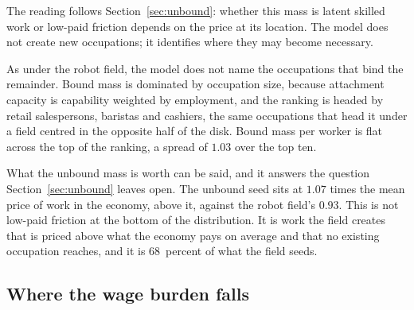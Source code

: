 \documentclass[12pt, a4paper]{article}
\begin{document}
The reading follows Section~\ref{sec:unbound}: whether this mass is
latent skilled work or low-paid friction depends on the price at its
location. The model does not create new occupations; it identifies
where they may become necessary.

As under the robot field, the model does not name
the occupations that bind the remainder. Bound mass is dominated by
occupation size, because attachment capacity is capability weighted by
employment, and the ranking is headed by retail salespersons, baristas
and cashiers, the same occupations that head it under a field centred in
the opposite half of the disk. Bound mass per worker is flat across the
top of the ranking, a spread of $1.03$ over the top ten.

What the unbound mass is worth can be said, and it answers the question
Section~\ref{sec:unbound} leaves open. The unbound seed sits at $1.07$
times the mean price of work in the economy, above it, against the robot
field's $0.93$. This is not low-paid friction at the bottom of the
distribution. It is work the field creates that is priced above what the
economy pays on average and that no existing occupation reaches, and it
is $68$~percent of what the field seeds.

\subsection{Where the wage burden falls}
\label{sec:cognitive-wages}
\end{document}
